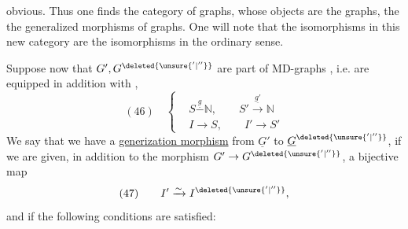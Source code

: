 obvious. Thus one finds the  category of graphs, whose objects are the graphs, the  the generalized morphisms of graphs. One will note that the isomorphisms in this new category are the isomorphisms in the ordinary sense.

Suppose now that $G',G^{\deleted{\unsure{'|''}}}$ are part of MD-graphs , i.e. are equipped in addition with ,
\[
(46)\quad\left\{\begin{aligned}
&S\overset{\underline g}{-}\mathbb N,\qquad S'\xrightarrow{\underline{g'}}\mathbb N\\
&I\longrightarrow S,\qquad I'\longrightarrow S'
\end{aligned}\right.
\]
We say that we have a \uline{generization morphism} from $\underline G'$ to $\underline G^{\deleted{\unsure{'|''}}}$, if we are given, in addition to the  morphism $G'\to G^{\deleted{\unsure{'|''}}}$, a bijective map
\[
(47)\qquad I'\xrightarrow{\sim}I^{\deleted{\unsure{'|''}}},
\]
 and if the following conditions are satisfied:
